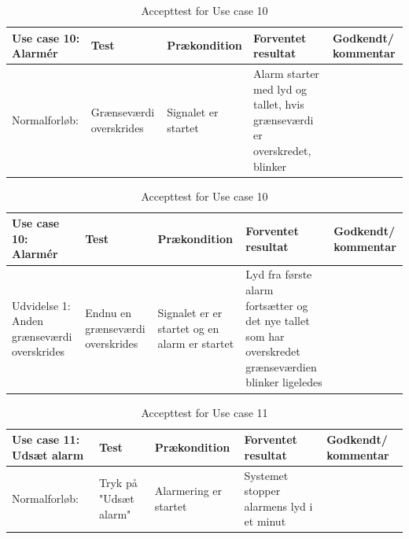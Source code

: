 \begin{table}[H]
\caption{Accepttest for Use case 10}\label{tab:tabel8}
\begin{tabular}{|>{\raggedright\arraybackslash}p{2.5cm}| >{\raggedright\arraybackslash}p{2.9cm} | >{\raggedright\arraybackslash}p{2.9cm} | >{\raggedright\arraybackslash}p{2.9cm} | >{\raggedright\arraybackslash}p{2.8cm} |}
   \hline
   \textbf{Use case 10: Alarmér } &\textbf{Test}& \textbf{Prækondition} & \textbf{Forventet resultat} & \textbf{Godkendt/ kommentar}\\ \hline
   Normalforløb:& Grænseværdi overskrides& Signalet er startet & Alarm starter med lyd og tallet, hvis grænseværdi er overskredet, blinker &\\\hline
\end{tabular}
\end{table}



\begin{table}[H]
\caption{Accepttest for Use case 10}\label{tab:tabel8}
\begin{tabular}{|>{\raggedright\arraybackslash}p{2.5cm}| >{\raggedright\arraybackslash}p{2.9cm} | >{\raggedright\arraybackslash}p{2.9cm} | >{\raggedright\arraybackslash}p{2.9cm} | >{\raggedright\arraybackslash}p{2.8cm} |}
   \hline
   \textbf{Use case 10: Alarmér } &\textbf{Test}& \textbf{Prækondition} & \textbf{Forventet resultat} & \textbf{Godkendt/ kommentar}\\ \hline
   Udvidelse 1: Anden grænseværdi overskrides & Endnu en grænseværdi overskrides & Signalet er er startet og en alarm er startet & Lyd fra første alarm fortsætter og det nye tallet som har overskredet grænseværdien blinker ligeledes &\\\hline
\end{tabular}
\end{table}



\begin{table}[H]
\caption{Accepttest for Use case 11}\label{tab:tabel8}
\begin{tabular}{|>{\raggedright\arraybackslash}p{2.5cm}| >{\raggedright\arraybackslash}p{2.9cm} | >{\raggedright\arraybackslash}p{2.9cm} | >{\raggedright\arraybackslash}p{2.9cm} | >{\raggedright\arraybackslash}p{2.8cm} |}
   \hline
   \textbf{Use case 11: Udsæt alarm } &\textbf{Test}& \textbf{Prækondition} & \textbf{Forventet resultat} & \textbf{Godkendt/ kommentar}\\ \hline
   Normalforløb:& Tryk på "Udsæt alarm" & Alarmering er startet & Systemet stopper alarmens lyd i et minut &\\\hline
\end{tabular}
\end{table}


